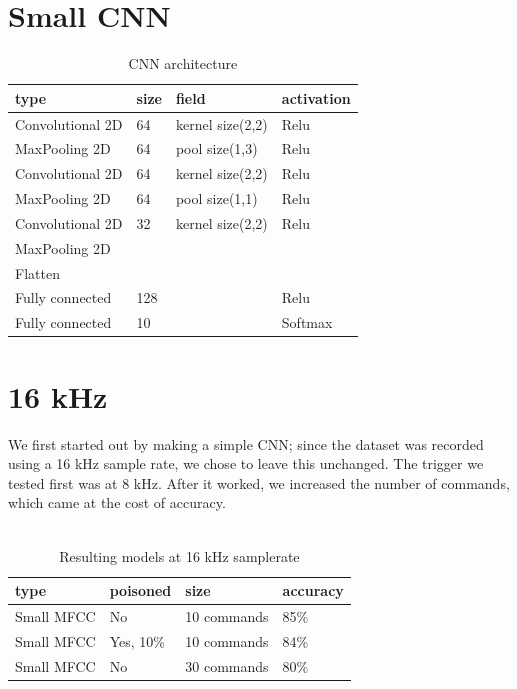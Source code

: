 \documentclass{report}
\theoremstyle{definition}
\theoremstyle{remark}
\begin{document}
\section{Small CNN}
\begin{table}[!hbt]
\centering
\begin{tabular}{llll}
\hline
type & size & field & activation \\ \hline
Convolutional 2D & 64 & kernel size(2,2) & Relu \\
MaxPooling 2D & 64 & pool size(1,3) & Relu \\
Convolutional 2D & 64 & kernel size(2,2) & Relu \\
MaxPooling 2D & 64 & pool size(1,1) & Relu \\
Convolutional 2D & 32 & kernel size(2,2) & Relu \\
MaxPooling 2D & & &  \\
Flatten & & &  \\
Fully connected & 128 & & Relu  \\
Fully connected & 10 & & Softmax \\ \hline
\end{tabular}
\caption{CNN architecture}
\end{table}

\section{16 kHz}
We first started out by making a simple CNN; since the dataset was recorded using a 16 kHz sample rate, we chose to leave this unchanged. The trigger we tested first was at 8 kHz. After it worked, we increased the number of commands, which came at the cost of accuracy. \\\\

\begin{table}[!hbt]
\centering
\begin{tabular}{|l|l|l|l|}
\hline
type & poisoned & size & accuracy \\ \hline
Small MFCC & No  &  10 commands  &  85\% \\ \hline
Small MFCC & Yes, 10\%  &  10 commands  & 84\%          \\ \hline
Small MFCC & No  &  30 commands  &   80\%       \\ \hline
\end{tabular}
\caption{Resulting models at 16 kHz samplerate}
\end{table}
\end{document}
